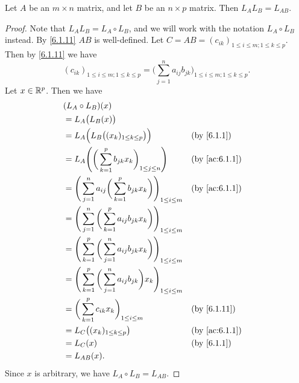 \begin{lem}\label{6.1.16}
  Let \(A\) be an \(m \times n\) matrix, and let \(B\) be an \(n \times p\) matrix.
  Then \(L_A L_B = L_{AB}\).
\end{lem}

\begin{proof}
  Note that \(L_A L_B = L_A \circ L_B\), and we will work with the notation \(L_A \circ L_B\) instead.
  By \cref{6.1.11} \(AB\) is well-defined.
  Let \(C = AB = (c_{ik})_{1 \leq i \leq m ; 1 \leq k \leq p}\).
  Then by \cref{6.1.11} we have
  \[
    (c_{ik})_{1 \leq i \leq m ; 1 \leq k \leq p} = \bigg(\sum_{j = 1}^n a_{ij} b_{jk}\bigg)_{1 \leq i \leq m ; 1 \leq k \leq p}.
  \]
  Let \(x \in \mathbb{R}^p\).
  Then we have
  \begin{align*}
     & (L_A \circ L_B)(x)                                                                                                           \\
     & = L_A\big(L_B(x)\big)                                                                                                        \\
     & = L_A\Big(L_B\big((x_k)_{1 \leq k \leq p}\big)\Big)                                         &  & \by{6.1.1}                  \\
     & = L_A\Bigg(\bigg(\sum_{k = 1}^p b_{jk} x_k\bigg)_{1 \leq j \leq n}\Bigg)                    &  & \text{(by \cref{ac:6.1.1})} \\
     & = \Bigg(\sum_{j = 1}^n a_{ij} \bigg(\sum_{k = 1}^p b_{jk} x_k\bigg)\Bigg)_{1 \leq i \leq m} &  & \text{(by \cref{ac:6.1.1})} \\
     & = \Bigg(\sum_{j = 1}^n \bigg(\sum_{k = 1}^p a_{ij} b_{jk} x_k\bigg)\Bigg)_{1 \leq i \leq m}                                  \\
     & = \Bigg(\sum_{k = 1}^p \bigg(\sum_{j = 1}^n a_{ij} b_{jk} x_k\bigg)\Bigg)_{1 \leq i \leq m}                                  \\
     & = \Bigg(\sum_{k = 1}^p \bigg(\sum_{j = 1}^n a_{ij} b_{jk}\bigg) x_k\Bigg)_{1 \leq i \leq m}                                  \\
     & = \bigg(\sum_{k = 1}^p c_{ik} x_k\bigg)_{1 \leq i \leq m}                                   &  & \text{(by \cref{6.1.11})}   \\
     & = L_C\big((x_k)_{1 \leq k \leq p}\big)                                                      &  & \text{(by \cref{ac:6.1.1})} \\
     & = L_C(x)                                                                                    &  & \by{6.1.1}                  \\
     & = L_{AB}(x).
  \end{align*}
  Since \(x\) is arbitrary, we have \(L_A \circ L_B = L_{AB}\).
\end{proof}


